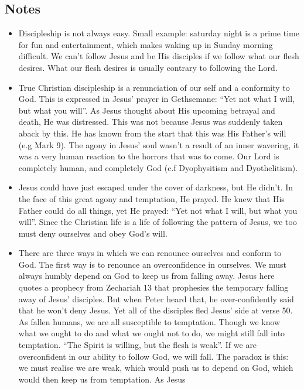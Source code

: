\subsection*{Notes}
\begin{itemize}
  \item{Discipleship is not always easy.  Small example: saturday night is a
  prime time for fun and entertainment, which makes waking up in Sunday
  morning difficult.  We can't follow Jesus and be His disciples if we follow
  what our flesh desires.  What our flesh desires is usually contrary to
  following the Lord.}
  \item{True Christian discipleship is a renunciation of our self and a
  conformity to God.  This is expressed in Jesus' prayer in Gethsemane: ``Yet
  not what I will, but what you will''.  As Jesus thought about His upcoming
  betrayal and death, He was distressed.  This was not because Jesus was
  suddenly taken aback by this.  He has known from the start that this was
  His Father's will (e.g Mark 9).  The agony in Jesus' soul wasn't a result
  of an inner wavering, it was a very human reaction to the horrors that was
  to come.  Our Lord is completely human, and completely God (c.f
  Dyophysitism and Dyothelitism).}
  \item{Jesus could have just escaped under the cover of darkness, but He
  didn't.  In the face of this great agony and temptation, He prayed.  He
  knew that His Father could do all things, yet He prayed: ``Yet not what I
  will, but what you will''.  Since the Christian life is a life of following
  the pattern of Jesus, we too must deny ourselves and obey God's will.}
  \item{There are three ways in which we can renounce ourselves and conform
  to God.  The first way is to renounce an overconfidence in ourselves.  We
  must always humbly depend on God to keep us from falling away.  Jesus here
  quotes a prophecy from Zechariah 13 that prophesies the temporary falling
  away of Jesus' disciples.  But when Peter heard that, he over-confidently
  said that he won't deny Jesus.  Yet all of the disciples fled Jesus' side
  at verse 50.  As fallen humans, we are all susceptible to temptation.
  Though we know what we ought to do and what we ought not to do, we might
  still fall into temptation.  ``The Spirit is willing, but the flesh is
  weak''.  If we are overconfident in our ability to follow God, we will
  fall.  The paradox is this: we must realise we are weak, which would push
  us to depend on God, which would then keep us from temptation.  As Jesus
}
\end{itemize}
